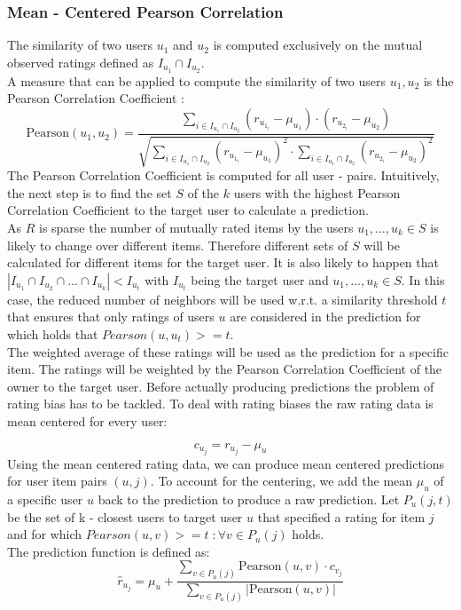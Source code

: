 \subsubsection{Mean - Centered Pearson Correlation}
The similarity of two users $u_1$ and $u_2$ is computed exclusively on the mutual observed ratings defined as $I_u_1 \cap I_u_2$.\\
A measure that can be applied to compute the similarity of two users $u_1, u_2$ is the Pearson Correlation Coefficient \cite{benesty2009pearson}:
\begin{equation}
    \text{Pearson}(u_1, u_2) = \frac{\sum\limits_{i \in I_u_1 \cap I_u_2} (r_{u_1_i} - \mu_u_1) \cdot (r_{u_2_i} - \mu_u_2)}{\sqrt{\sum\limits_{i \in I_u_1 \cap I_u_2} (r_{u_1_i} - \mu_u_1)^2 \cdot \sum\limits_{i \in I_u_1 \cap I_u_2} (r_{u_2_i} - \mu_u_2)^2}}
\end{equation}
The Pearson Correlation Coefficient is computed for all user - pairs. Intuitively, the next step is to find the set $S$ of the $k$ users with the highest Pearson Correlation Coefficient to the target user to calculate a prediction.\\
As $R$ is sparse the number of mutually rated items by the users $u_1,\dots,u_k \in S$ is likely to change over different items. Therefore different sets of $S$ will be calculated for different items for the target user. It is also likely to happen that $|I_{u_1} \cap I_{u_2} \cap \dots \cap I_{u_k}| < I_{u_t}$ with $I_{u_t}$ being the target user and $u_1,\dots,u_k \in S$. In this case, the reduced number of neighbors will be used w.r.t. a similarity threshold $t$ that ensures that only ratings of users $u$ are considered in the prediction for which holds that $Pearson(u, u_t) >= t$.\\
The weighted average of these ratings will be used as the prediction for a specific item. The ratings will be weighted by the Pearson Correlation Coefficient of the owner to the target user.
Before actually producing predictions the problem of rating bias has to be tackled. To deal with rating biases the raw rating data is mean centered for every user:

\begin{equation}
    c_{u_j} = r_{u_j} - \mu_u
\end{equation}
Using the mean centered rating data, we can produce mean centered predictions for user item pairs $(u,j)$. To account for the centering, we add the mean $\mu_u$ of a specific user $u$ back to the prediction to produce a raw prediction. Let $P_u(j,t)$ be the set of k - closest users to target user $u$ that specified a rating for item $j$ and for which $Pearson(u, v) >= t\;: \forall{v} \in P_u(j)$ holds.\\ The prediction function is defined as: 
\begin{equation}
    \hat{r}_{u_j} = \mu_u + \frac{\sum\limits_{v \in P_u(j)}\text{Pearson}(u, v) \cdot c_{v_j}}{\sum\limits_{v \in P_u(j)} |\text{Pearson}(u, v)|}
\end{equation}

